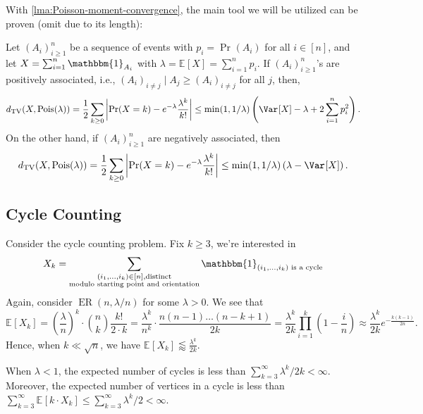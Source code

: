 With \autoref{lma:Poisson-moment-convergence}, the main tool we will be utilized can be proven (omit due to its length):

\begin{theorem}\label{thm:Stein-Chen-method}
	Let \((A_i)_{i \geq 1}^{n}\) be a sequence of events with \(p_i = \Pr_{}(A_i) \) for all \(i \in [n]\), and let \(X = \sum_{i=1}^{n} \mathbbm{1}_{A_i} \) with \(\lambda = \mathbb{E}_{}[X] = \sum_{i=1}^{n} p_i\). If \((A_i)_{i \geq 1}^{n}\)'s are positively associated, i.e., \((A_i)_{i \neq j} \mid A_j \geq (A_i)_{i \neq j}\) for all \(j\), then,
	\[
		d_{\mathrm{TV} }(X, \operatorname{Pois}(\lambda ) )
		= \frac{1}{2} \sum_{k \geq 0} \left\lvert \Pr_{}(X = k) - e^{-\lambda } \frac{\lambda ^k }{k!}  \right\rvert
		\leq \min ( 1, 1 / \lambda ) \left( \Var_{}[X] - \lambda + 2 \sum_{i=1}^{n} p_i^2 \right).
	\]
	On the other hand, if \((A_i)_{i\geq 1}^{n}\) are negatively associated, then
	\[
		d_{\mathrm{TV} }(X, \operatorname{Pois}(\lambda ) )
		= \frac{1}{2} \sum_{k \geq 0} \left\lvert \Pr_{}(X = k) - e^{-\lambda } \frac{\lambda ^k }{k!}  \right\rvert
		\leq \min ( 1, 1 / \lambda ) \left( \lambda - \Var_{}[X] \right).
	\]
\end{theorem}

\begin{remark}

\end{remark}

\subsection{Cycle Counting}
Consider the cycle counting problem. Fix \(k \geq 3\), we're interested in
\[
	X_k = \sum_{\substack{(i_1, \dots , i_k) \in [n], \text{distinct} \\ \text{modulo starting point and orientation} }} \mathbbm{1}_{(i_1, \dots , i_k) \text{ is a cycle} }
\]
Again, consider \(\operatorname{ER}(n, \lambda / n) \) for some \(\lambda > 0\). We see that
\[
	\mathbb{E}_{}[X_k]
	= \left( \frac{\lambda}{n} \right) ^k \cdot \binom{n}{k} \frac{k!}{2 \cdot k}
	= \frac{\lambda ^k}{n^k} \cdot \frac{n(n-1) \dots (n-k+1)}{2k}
	= \frac{\lambda ^k}{2k} \prod_{i=1}^{k} \left( 1 - \frac{i}{n} \right)
	\approx \frac{\lambda ^k}{2k} e^{- \frac{k (k-1)}{2n}}.
\]
Hence, when \(k \ll \sqrt{n} \), we have \(\mathbb{E}_{}[X_k] \lessapprox \frac{\lambda ^k}{2k}\).

\begin{corollary}
	When \(\lambda < 1\), the expected number of cycles is less than \(\sum_{k=3}^{\infty} \lambda ^k / 2k < \infty \). Moreover, the expected number of vertices in a cycle is less than \(\sum_{k=3}^{\infty} \mathbb{E}_{}[k \cdot X_k] \leq \sum_{k=3}^{\infty} \lambda ^k / 2 < \infty \).
\end{corollary}

